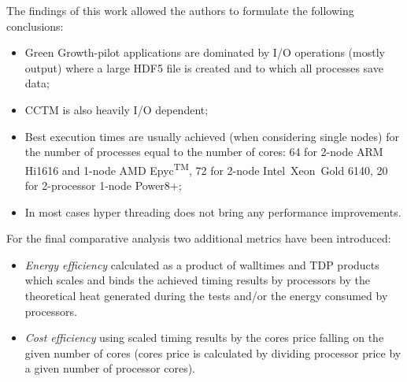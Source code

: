 The findings of this work allowed the authors to formulate the following conclusions:
\begin{itemize}
  \item[\textbullet]Green Growth-pilot applications are dominated by I/O operations (mostly output) where a large HDF5 file is created and to which all processes save data;
  \item[\textbullet]CCTM is also heavily I/O dependent;
  \item[\textbullet]Best execution times are usually achieved (when considering single nodes) for the number of processes equal to the number of cores: 64 for 2-node ARM Hi1616 and 1-node AMD Epyc\textsuperscript{TM}, 72 for 2-node Intel\textregistered\ Xeon\textregistered\ Gold 6140, 20 for 2-processor 1-node Power8+;
  \item[\textbullet]In most cases hyper threading does not bring any performance improvements.
\end{itemize}

For the final comparative analysis two additional metrics have been introduced: 
\begin{itemize}
  \item[\textbullet]\textit{Energy efficiency} calculated as a product of walltimes and TDP products which scales and binds the achieved timing results by processors by the theoretical heat generated during the tests and/or the energy consumed by processors.
  \item[\textbullet]\textit{Cost efficiency} using scaled timing results by the cores price falling on the given number of cores (cores price is calculated by dividing processor price by a given number of processor cores).
\end{itemize}

